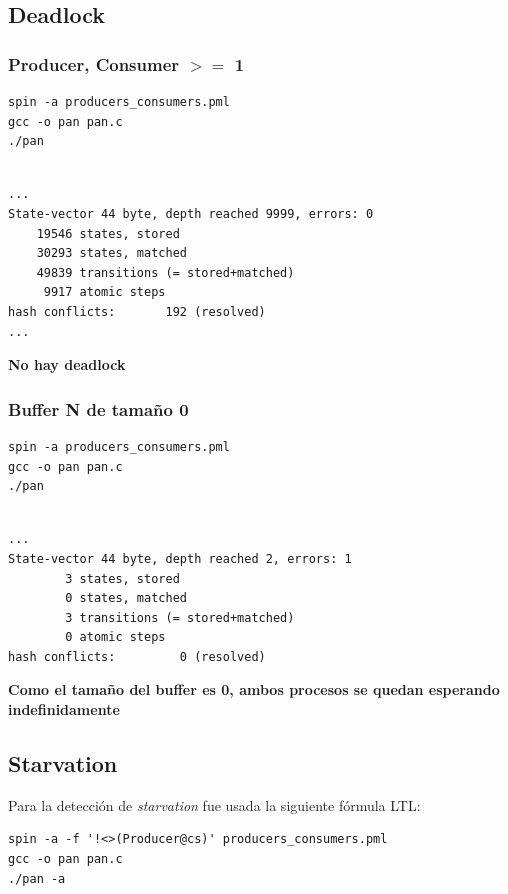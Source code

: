 \documentclass[a4paper,12pt]{article}
\begin{document}
\subsection{Deadlock}
\subsubsection{Producer, Consumer $>=$ 1}

\begin{lstlisting}
spin -a producers_consumers.pml
gcc -o pan pan.c 
./pan
\end{lstlisting}

\begin{lstlisting}[frame=single]  % Start your code-block

...
State-vector 44 byte, depth reached 9999, errors: 0
    19546 states, stored
    30293 states, matched
    49839 transitions (= stored+matched)
     9917 atomic steps
hash conflicts:       192 (resolved)
...
\end{lstlisting}
\textbf{No hay deadlock}

\subsubsection{Buffer N de tamaño 0}

\begin{lstlisting}
spin -a producers_consumers.pml
gcc -o pan pan.c 
./pan
\end{lstlisting}

\begin{lstlisting}[frame=single]  % Start your code-block

...
State-vector 44 byte, depth reached 2, errors: 1
        3 states, stored
        0 states, matched
        3 transitions (= stored+matched)
        0 atomic steps
hash conflicts:         0 (resolved)
\end{lstlisting}
\textbf{Como el tamaño del buffer es 0, ambos procesos se quedan esperando indefinidamente}
\subsection{Starvation}

Para la detección de \textit{starvation} fue usada la siguiente fórmula LTL: 

\begin{lstlisting}
spin -a -f '!<>(Producer@cs)' producers_consumers.pml
gcc -o pan pan.c
./pan -a
\end{lstlisting}
\end{document}
